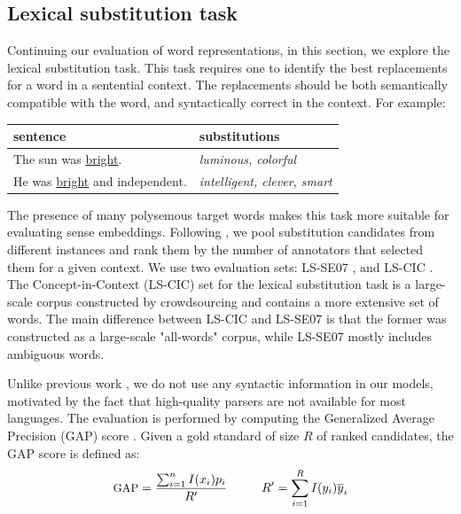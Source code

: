 \subsection{Lexical substitution task}

Continuing our evaluation of word representations, in this section, we explore the lexical substitution task. 
This task requires one to identify the best replacements for a word in a sentential context. The replacements should be both semantically compatible with the word, and syntactically correct in the context. For example:

\vspace{1mm}

\begin{center}\small
\setlength{\tabcolsep}{20pt}
\begin{tabular}{l l}
\textbf{sentence} & \textbf{substitutions} \\ \hline
The sun was \underline{bright}. & \textit{luminous, colorful}  \\
He was \underline{bright} and independent.  & \textit{intelligent, clever, smart} \\
\end{tabular}
\end{center}

\vspace{1mm}

The presence of many polysemous target words makes this task more suitable for evaluating sense embeddings. %
Following \citet{melamud2015simple}, we pool substitution candidates 
from different instances and rank them by the number of annotators that selected them for a given context. 
We use two evaluation sets: LS-SE07 \citep{mccarthy2007semeval}, and LS-CIC \citep{kremer2014substitutes}.
The Concept-in-Context (LS-CIC) set for the lexical substitution task is a large-scale corpus constructed by crowdsourcing \citep{kremer2014substitutes} and contains a more extensive set of words. 
The main difference between LS-CIC and LS-SE07 is that the former was constructed as a large-scale "all-words" corpus, while LS-SE07 mostly includes ambiguous words. 

Unlike previous work \citep{DBLP:conf/emnlp/SzarvasBH13,kremer2014substitutes,melamud2015simple}, we do not use any syntactic information in our models, %
motivated by the fact that high-quality parsers are not available for most languages.
The evaluation is performed by computing the Generalized Average Precision (GAP) score \citep{kishida2005property}. %
Given a gold standard of size $R$ of ranked candidates, the GAP score is defined as:
\begin{equation}
\small
\textrm{GAP} = \frac{\sum_{i=1}^n I(x_i) p_i}{R'}    \quad \quad \quad         R' = \sum_{i=1}^R I(y_i)\overline{y}_i
 \end{equation}
 
